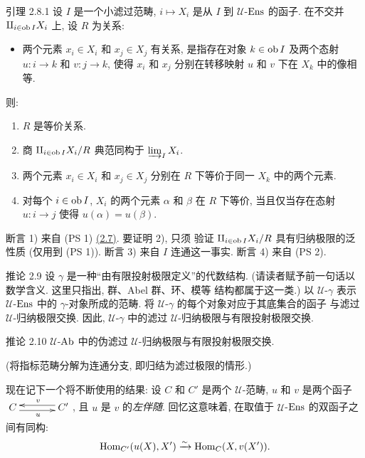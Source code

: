 \begin{enonce*}{引理 2.8.1}
设 $I$ 是一个小滤过范畴, $i\mapsto X_i$ 是从 $I$ 到 $𝒰$-$\operatorname{Ens}$ 的函子.
在不交并 $\amalg_{i\in
 \operatorname{ob} I} X_i$ 上, 设 $R$ 为关系:
\begin{itemize}
\item[(R)] 两个元素 $x_i\in X_i$ 和 $x_j\in X_j$ 有关系,
是指存在对象 $k\in \operatorname{ob} I$ 及两个态射
$u:i\rightarrow k$ 和 $v:j\rightarrow k$,
使得 $x_i$ 和 $x_j$ 分别在转移映射 $u$ 和 $v$ 下在 $X_k$ 中的像相等.
\end{itemize}
则:\pageoriginale
\begin{enumerate}
\renewcommand{\labelenumi}{\theenumi)}
\item $R$ 是等价关系.

\item 商 $\amalg_{i\in \operatorname{ob} I}X_i/R$ 典范同构于 $\varinjlim_I X_i$.

\item 两个元素 $x_i\in X_i$ 和 $x_j\in X_j$
分别在 $R$ 下等价于同一 $X_k$ 中的两个元素.

\item 对每个 $i\in \operatorname{ob} I$, $X_i$ 的两个元素 $\alpha$ 和 $\beta$
在 $R$ 下等价, 当且仅当存在态射
$u:i\rightarrow j$ 使得 $u(\alpha)=u(\beta)$.
\end{enumerate}
\end{enonce*}

断言 1) 来自 (PS 1) \hyperref[I.def2.7]{(2.7)}. 要证明 2), 只须 %
验证 $\amalg_{i\in \operatorname{ob} I}X_i/R$ 具有归纳极限的泛性质
(仅用到 (PS 1)). 断言 3) 来自 $I$ 连通这一事实.
断言 4) 来自 (PS 2).

\begin{enonce*}{推论 2.9}
设 $%
\gamma$ 是一种“由有限投射极限定义”的代数结构.
(请读者赋予前一句话以数学含义.
这里只指出, 群、Abel 群、环、模等 %
结构都属于这一类.) 以 $𝒰$-$\gamma$ 表示
$𝒰$-$\operatorname{Ens}$ 中的 $\gamma$-对象所成的范畴.
将 $𝒰$-$\gamma$ 的每个对象对应于其底集合的函子
与滤过 $𝒰$-归纳极限交换.
因此, $𝒰$-$\gamma$ 中的滤过 $𝒰$-归纳极限与有限投射极限交换.
\end{enonce*}

\begin{enonce*}{推论 2.10}
$𝒰$-$\operatorname{Ab}$ 中的伪滤过 $𝒰$-归纳极限与有限投射极限交换.
\end{enonce*}

(将指标范畴分解为连通分支, 即归结为滤过极限的情形.)

现在记下\pageoriginale{}一个将不断使用的结果:
设 $C$ 和 $C'$ 是两个 $𝒰$-范畴,
$u$ 和 $v$ 是两个函子 $\xymatrix@C=1.25cm{ C  \ar@<-.6ex>[r]_u & C'
\ar@<-.6ex>[l]_v }$, 且 $u$ 是 $v$ 的\emph{左伴随}.
回忆这意味着, 在取值于 $𝒰$-$\operatorname{Ens}$ 的双函子之间有同构:
$$
\operatorname{Hom}_{C'}(u(X),X')\xrightarrow{\sim}\operatorname{Hom}_{C}(X,v(X')){}.
$$

